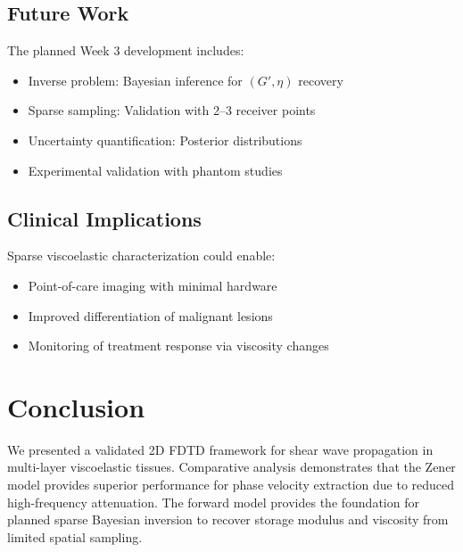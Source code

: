 \documentclass[journal,twoside,a4paper]{IEEEtran}
\begin{document}
\subsection{Future Work}

The planned Week 3 development includes:
\begin{itemize}
    \item Inverse problem: Bayesian inference for $(G', \eta)$ recovery
    \item Sparse sampling: Validation with 2--3 receiver points
    \item Uncertainty quantification: Posterior distributions
    \item Experimental validation with phantom studies
\end{itemize}

\subsection{Clinical Implications}

Sparse viscoelastic characterization could enable:
\begin{itemize}
    \item Point-of-care imaging with minimal hardware
    \item Improved differentiation of malignant lesions
    \item Monitoring of treatment response via viscosity changes
\end{itemize}

\section{Conclusion}
\label{sec:conclusion}

We presented a validated 2D FDTD framework for shear wave propagation 
in multi-layer viscoelastic tissues. Comparative analysis demonstrates 
that the Zener model provides superior performance for phase velocity 
extraction due to reduced high-frequency attenuation. The forward model 
provides the foundation for planned sparse Bayesian inversion to recover 
storage modulus and viscosity from limited spatial sampling.

\end{document}
